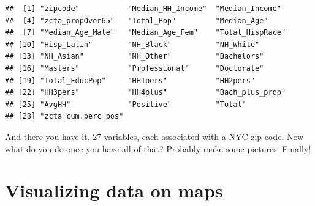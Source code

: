 \documentclass[openany]{book}
\newenvironment{Shaded}{\begin{snugshade}}{\end{snugshade}}
\newcommand{\DataTypeTok}[1]{\textcolor[rgb]{0.13,0.29,0.53}{#1}}
\newcommand{\KeywordTok}[1]{\textcolor[rgb]{0.13,0.29,0.53}{\textbf{#1}}}
\newcommand{\NormalTok}[1]{#1}
\newcommand{\OperatorTok}[1]{\textcolor[rgb]{0.81,0.36,0.00}{\textbf{#1}}}
\newcommand{\StringTok}[1]{\textcolor[rgb]{0.31,0.60,0.02}{#1}}
\begin{document}
\begin{Shaded}
\end{Shaded}

\begin{verbatim}
##  [1] "zipcode"           "Median_HH_Income"  "Median_Income"    
##  [4] "zcta_propOver65"   "Total_Pop"         "Median_Age"       
##  [7] "Median_Age_Male"   "Median_Age_Fem"    "Total_HispRace"   
## [10] "Hisp_Latin"        "NH_Black"          "NH_White"         
## [13] "NH_Asian"          "NH_Other"          "Bachelors"        
## [16] "Masters"           "Professional"      "Doctorate"        
## [19] "Total_EducPop"     "HH1pers"           "HH2pers"          
## [22] "HH3pers"           "HH4plus"           "Bach_plus_prop"   
## [25] "AvgHH"             "Positive"          "Total"            
## [28] "zcta_cum.perc_pos"
\end{verbatim}

And there you have it. 27 variables, each associated with a NYC zip code. Now what do you do once you have all of that? Probably make some pictures. Finally!

\hypertarget{mapviz}{%
\section{Visualizing data on maps}\label{mapviz}}
\end{document}
